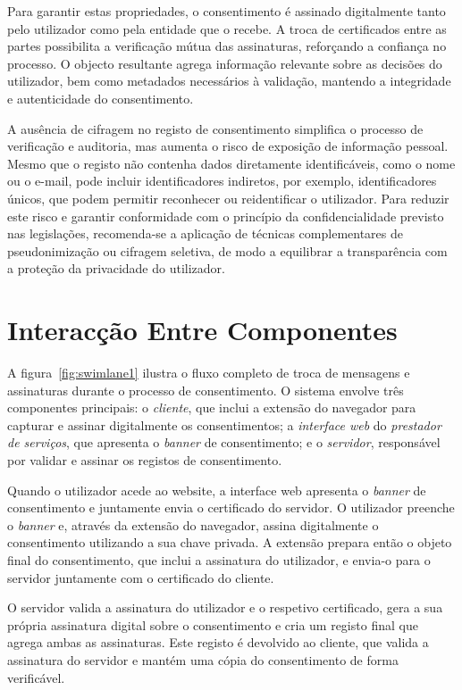 Para garantir estas propriedades, o consentimento é assinado digitalmente tanto pelo utilizador como pela entidade que o recebe. A troca de certificados entre as partes possibilita a verificação mútua das assinaturas, reforçando a confiança no processo. O objecto resultante agrega informação relevante sobre as decisões do utilizador, bem como metadados necessários à validação, mantendo a integridade e autenticidade do consentimento.

A ausência de cifragem no registo de consentimento simplifica o processo de verificação e auditoria, mas aumenta o risco de exposição de informação pessoal. Mesmo que o registo não contenha dados diretamente identificáveis, como o nome ou o e-mail, pode incluir identificadores indiretos, por exemplo, identificadores únicos, que podem permitir reconhecer ou reidentificar o utilizador. Para reduzir este risco e garantir conformidade com o princípio da confidencialidade previsto nas legislações, recomenda-se a aplicação de técnicas complementares de pseudonimização ou cifragem seletiva, de modo a equilibrar a transparência com a proteção da privacidade do utilizador.

\section{Interacção Entre Componentes}

A figura~\ref{fig:swimlane1} ilustra o fluxo completo de troca de mensagens e assinaturas durante o processo de consentimento. O sistema envolve três componentes principais: o \textit{cliente}, que inclui a extensão do navegador para capturar e assinar digitalmente os consentimentos; a \textit{interface web} do \textit{prestador de serviços}, que apresenta o \textit{banner} de consentimento; e o \textit{servidor}, responsável por validar e assinar os registos de consentimento.

Quando o utilizador acede ao website, a interface web apresenta o \textit{banner} de consentimento e juntamente envia o certificado do servidor. O utilizador preenche o \textit{banner} e, através da extensão do navegador, assina digitalmente o consentimento utilizando a sua chave privada. A extensão prepara então o objeto final do consentimento, que inclui a assinatura do utilizador, e envia-o para o servidor juntamente com o certificado do cliente.

O servidor valida a assinatura do utilizador e o respetivo certificado, gera a sua própria assinatura digital sobre o consentimento e cria um registo final que agrega ambas as assinaturas. Este registo é devolvido ao cliente, que valida a assinatura do servidor e mantém uma cópia do consentimento de forma verificável.

